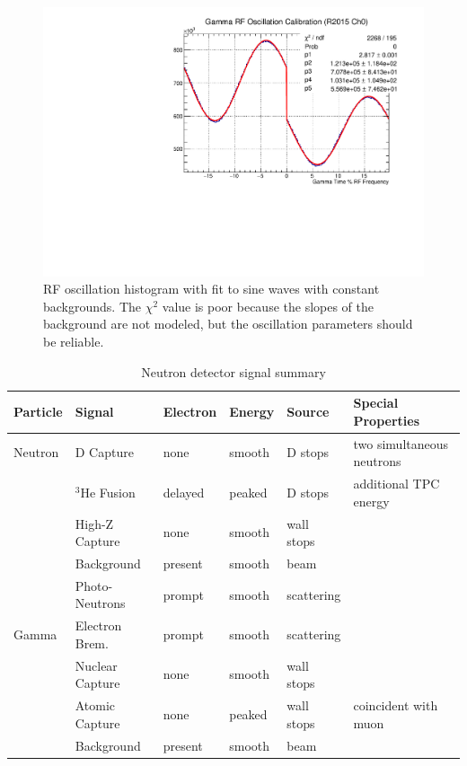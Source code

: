 \begin{figure}[h]
  \includegraphics[width=\textwidth]{neutrons/figures/RF_oscillation_calib.pdf}
  \caption{RF oscillation histogram with fit to sine waves with constant backgrounds.  The $\chi^2$ value is poor because the slopes of the background are not modeled, but the oscillation parameters should be reliable.}
  \label{fig:rf_calib}
\end{figure}

\begin{table}[h]
  \begin{center}
    \caption{Neutron detector signal summary}
    \label{tab:signal_summary}
    \begin{tabular}{ | l | l | l | l | l | l | }
      \hline
      Particle  & Signal          & Electron  & Energy  & Source      & Special Properties        \\
      \hline
      Neutron   & D Capture       & none      & smooth  & D stops     & two simultaneous neutrons \\
                & $^3$He Fusion   & delayed   & peaked  & D stops     & additional TPC energy     \\
                & High-Z Capture  & none      & smooth  & wall stops  & \\
                & Background      & present   & smooth  & beam        & \\
                & Photo-Neutrons  & prompt    & smooth  & scattering  & \\
      \hline
      Gamma     & Electron Brem.  & prompt    & smooth  & scattering  & \\
                & Nuclear Capture & none      & smooth  & wall stops  & \\
                & Atomic Capture  & none      & peaked  & wall stops  & coincident with muon      \\
                & Background      & present   & smooth  & beam        & \\
      \hline
    \end{tabular}
  \end{center}
\end{table}

